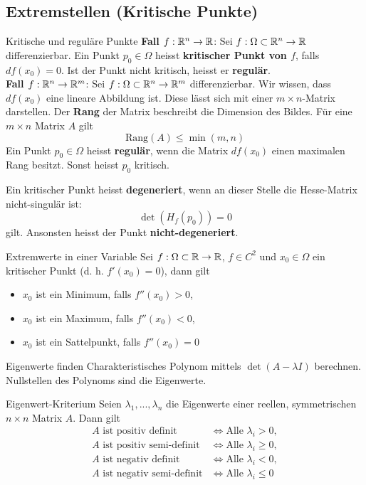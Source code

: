 
\subsection{Extremstellen (Kritische Punkte)}

\begin{Definition}[label=R1]{Kritische und reguläre Punkte}{}
	\textbf{Fall $f: \mathbb{R}^n \to \mathbb{R}$}: Sei 	$f: \Omega \subset \mathbb{R}^n \to \mathbb{R}$ differenzierbar. Ein Punkt $p_0 \in \Omega$ heisst \textbf{kritischer Punkt von $f$}, falls $df(x_0)=0$. Ist der Punkt nicht kritisch, heisst er \textbf{regulär}.\\
	
	\textbf{Fall $f: \mathbb{R}^n \to \mathbb{R}^m$}: Sei $f: \Omega \subset \mathbb{R}^n \to \mathbb{R}^m$ differenzierbar. Wir wissen, dass $df(x_0)$ eine lineare Abbildung ist. Diese lässt sich mit einer $m\times n$-Matrix darstellen. Der \textbf{Rang} der Matrix beschreibt die Dimension des Bildes. Für eine $m \times n$ Matrix $A$ gilt \[\text{Rang}(A) \leq \min(m, n)\] Ein Punkt $p_0 \in \Omega$ heisst \textbf{regulär}, wenn die Matrix $df(x_0)$ einen maximalen Rang besitzt. Sonst heisst $p_0$ kritisch.
	
	Ein kritischer Punkt heisst \textbf{degeneriert}, wenn an dieser Stelle die Hesse-Matrix nicht-singulär ist: \[\det(H_f(p_0))=0\] gilt. Ansonsten heisst der Punkt \textbf{nicht-degeneriert}.
\end{Definition}

\begin{Satz}{Extremwerte in einer Variable}{}
	Sei $f: \Omega \subset \mathbb{R} \to \mathbb{R}$, $f \in C^2$ und $x_0 \in \Omega$ ein kritischer Punkt (d. h. $f'(x_0) = 0$), dann gilt
	\begin{itemize}
		\item $x_0$ ist ein Minimum, falls $f''(x_0) > 0$,
		\item $x_0$ ist ein Maximum, falls $f''(x_0) < 0$,
		\item $x_0$ ist ein Sattelpunkt, falls $f''(x_0) = 0$
	\end{itemize}
\end{Satz}

\begin{Rezept}{Eigenwerte finden}{}
	Charakteristisches Polynom mittels $\det (A-\lambda I)$ berechnen. Nullstellen des Polynoms sind die Eigenwerte.
\end{Rezept}

\begin{Satz}{Eigenwert-Kriterium}{}
	Seien $\lambda_1, ..., \lambda_n$ die Eigenwerte einer reellen, symmetrischen $n \times n$ Matrix $A$. Dann gilt
	\begin{align*}
		A \text{ ist positiv definit} &\iff \text{Alle }\lambda_i > 0,\\
		A \text{ ist positiv semi-definit} &\iff \text{Alle }\lambda_i \geq 0,\\
		A \text{ ist negativ definit} &\iff \text{Alle }\lambda_i < 0,\\
		A \text{ ist negativ semi-definit} &\iff \text{Alle }\lambda_i \leq 0
	\end{align*}
\end{Satz}

